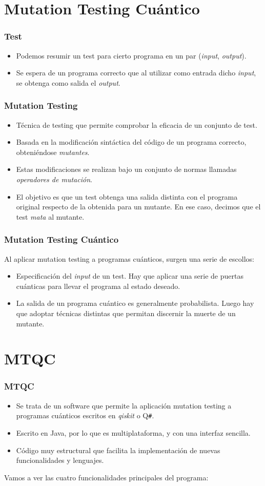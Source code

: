 \documentclass{beamer}
\newcommand{\qsh}{\textsf{Q}\texttt{\#}} %
\begin{document}
\section{Mutation Testing Cuántico}
\begin{frame}
	\frametitle{Test}
	\begin{itemize}
		\item Podemos resumir un test para cierto programa en un par (\textit{input}, \textit{output}).
		\item Se espera de un programa correcto que al utilizar como entrada dicho \textit{input}, se obtenga como salida el \textit{output}.		
	\end{itemize}
\end{frame}	
\begin{frame}
	\frametitle{Mutation Testing}
	\begin{itemize}
		\item Técnica de testing que permite comprobar la eficacia de un conjunto de test.
		\item Basada en la modificación sintáctica del código de un programa correcto, obteniéndose \textit{mutantes}.
		\item Estas modificaciones se realizan bajo un conjunto de normas llamadas \textit{operadores de mutación}.
		\item El objetivo es que un test obtenga una salida distinta con el programa original respecto de la obtenida para un mutante. En ese caso, decimos que el test \textit{mata} al mutante.
	\end{itemize}
\end{frame}
\begin{frame}
	\frametitle{Mutation Testing Cuántico}
	Al aplicar mutation testing a programas cuánticos, surgen una serie de escollos:
	\begin{itemize}
		\item Especificación del \textit{input} de un test. Hay que aplicar una serie de puertas cuánticas para llevar el programa al estado deseado.
		\item La salida de un programa cuántico es generalmente probabilista. Luego hay que adoptar técnicas distintas que permitan discernir la muerte de un mutante.
	\end{itemize}
\end{frame}	

\section{MTQC}
\begin{frame}
	\frametitle{MTQC}
	\begin{itemize}
		\item Se trata de un software que permite la aplicación mutation testing a programas cuánticos escritos en \textit{qiskit} o \qsh.
		\item Escrito en Java, por lo que es multiplataforma, y con una interfaz sencilla.
		\item Código muy estructural que facilita la implementación de nuevas funcionalidades y lenguajes.
	\end{itemize}
	Vamos a ver las cuatro funcionalidades principales del programa:
\end{frame}
\end{document}
